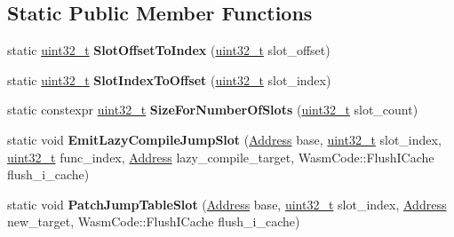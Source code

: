 \subsection*{Static Public Member Functions}
\begin{DoxyCompactItemize}
\item 
\mbox{\label{classv8_1_1internal_1_1wasm_1_1JumpTableAssembler_ada6cc7624595bb4befe6288661dc75ba}} 
static \mbox{\hyperlink{classuint32__t}{uint32\+\_\+t}} {\bfseries Slot\+Offset\+To\+Index} (\mbox{\hyperlink{classuint32__t}{uint32\+\_\+t}} slot\+\_\+offset)
\item 
\mbox{\label{classv8_1_1internal_1_1wasm_1_1JumpTableAssembler_a76862a12e9a584180bc139b3c4b8fb64}} 
static \mbox{\hyperlink{classuint32__t}{uint32\+\_\+t}} {\bfseries Slot\+Index\+To\+Offset} (\mbox{\hyperlink{classuint32__t}{uint32\+\_\+t}} slot\+\_\+index)
\item 
\mbox{\label{classv8_1_1internal_1_1wasm_1_1JumpTableAssembler_a5515cdbbc42cf3c78581ea13768f74bb}} 
static constexpr \mbox{\hyperlink{classuint32__t}{uint32\+\_\+t}} {\bfseries Size\+For\+Number\+Of\+Slots} (\mbox{\hyperlink{classuint32__t}{uint32\+\_\+t}} slot\+\_\+count)
\item 
\mbox{\label{classv8_1_1internal_1_1wasm_1_1JumpTableAssembler_a8636366059bbfad3fd66d3dd96ca0550}} 
static void {\bfseries Emit\+Lazy\+Compile\+Jump\+Slot} (\mbox{\hyperlink{classuintptr__t}{Address}} base, \mbox{\hyperlink{classuint32__t}{uint32\+\_\+t}} slot\+\_\+index, \mbox{\hyperlink{classuint32__t}{uint32\+\_\+t}} func\+\_\+index, \mbox{\hyperlink{classuintptr__t}{Address}} lazy\+\_\+compile\+\_\+target, Wasm\+Code\+::\+Flush\+I\+Cache flush\+\_\+i\+\_\+cache)
\item 
\mbox{\label{classv8_1_1internal_1_1wasm_1_1JumpTableAssembler_a81a4843c673e22849c9570d5cf0a1cf3}} 
static void {\bfseries Patch\+Jump\+Table\+Slot} (\mbox{\hyperlink{classuintptr__t}{Address}} base, \mbox{\hyperlink{classuint32__t}{uint32\+\_\+t}} slot\+\_\+index, \mbox{\hyperlink{classuintptr__t}{Address}} new\+\_\+target, Wasm\+Code\+::\+Flush\+I\+Cache flush\+\_\+i\+\_\+cache)
\end{DoxyCompactItemize}

